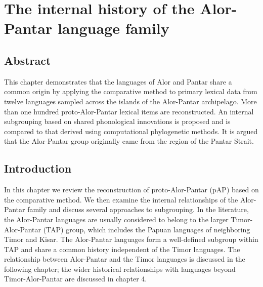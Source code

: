 
\chapter{The internal history of the Alor-Pantar language family}
\section*{Abstract}
This chapter demonstrates that the languages of Alor and Pantar share a common origin by applying the comparative method to primary lexical data from twelve languages sampled across the islands of the Alor-Pantar archipelago. More than one hundred proto-Alor-Pantar lexical items are reconstructed. An internal subgrouping based on shared phonological innovations is proposed and is compared to that derived using computational phylogenetic methods. It is argued that the Alor-Pantar group originally came from the region of the Pantar Strait.


\section{Introduction}\footnotemark{}
\hypertarget{Toc376957608}{}
In this chapter we review the reconstruction of proto-Alor-Pantar (pAP) based on the comparative method. We then examine the internal relationships of the Alor-Pantar family and discuss several approaches to subgrouping. In the literature, the Alor-Pantar languages are usually considered to belong to the larger Timor-Alor-Pantar (TAP) group, which includes the Papuan languages of neighboring Timor and Kisar. The Alor-Pantar languages form a well-defined subgroup within TAP and share a common history independent of the Timor languages. The relationship between Alor-Pantar and the Timor languages is discussed in the following chapter; the wider historical relationships with languages beyond Timor-Alor-Pantar are discussed in chapter 4.


